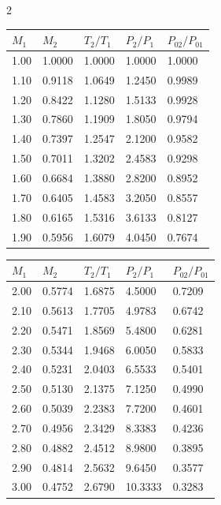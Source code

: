  
 \begin{multicols}{2}
 \begin{tabular}{|l|l|l|l|l|}
 \hline
 $M_1$ & $M_2$ & $T_2/T_1$ & $P_2/P_1$ & $P_{02}/P_{01}$ \\\hline
1.00&1.0000&1.0000& 1.0000&1.0000\\\hline
1.10&0.9118&1.0649& 1.2450&0.9989\\\hline
1.20&0.8422&1.1280& 1.5133&0.9928\\\hline
1.30&0.7860&1.1909& 1.8050&0.9794\\\hline
1.40&0.7397&1.2547& 2.1200&0.9582\\\hline
1.50&0.7011&1.3202& 2.4583&0.9298\\\hline
1.60&0.6684&1.3880& 2.8200&0.8952\\\hline
1.70&0.6405&1.4583& 3.2050&0.8557\\\hline
1.80&0.6165&1.5316& 3.6133&0.8127\\\hline
1.90&0.5956&1.6079& 4.0450&0.7674\\\hline
 \end{tabular}
 \begin{tabular}{|l|l|l|l|l|}
 \hline
 $M_1$ & $M_2$ & $T_2/T_1$ & $P_2/P_1$ & $P_{02}/P_{01}$ \\\hline
2.00&0.5774&1.6875& 4.5000&0.7209\\\hline
2.10&0.5613&1.7705& 4.9783&0.6742\\\hline
2.20&0.5471&1.8569& 5.4800&0.6281\\\hline
2.30&0.5344&1.9468& 6.0050&0.5833\\\hline
2.40&0.5231&2.0403& 6.5533&0.5401\\\hline
2.50&0.5130&2.1375& 7.1250&0.4990\\\hline
2.60&0.5039&2.2383& 7.7200&0.4601\\\hline
2.70&0.4956&2.3429& 8.3383&0.4236\\\hline
2.80&0.4882&2.4512& 8.9800&0.3895\\\hline
2.90&0.4814&2.5632& 9.6450&0.3577\\\hline
3.00&0.4752&2.6790&10.3333&0.3283\\\hline
 \end{tabular}
 \end{multicols}
 
